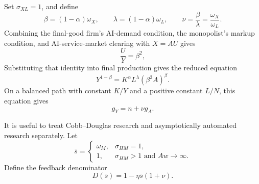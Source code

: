 Set \(\sigma_{XL}=1\), and define
\begin{equation}
 \beta=(1-\alpha)\omega_X,\qquad
 \lambda=(1-\alpha)\omega_L,\qquad
 \nu=\frac{\beta}{\lambda}=\frac{\omega_X}{\omega_L}.
 \label{eq:axm-cd-definitions}
\end{equation}
Combining the final-good firm's AI-demand condition, the monopolist's markup
condition, and AI-service-market clearing with \(X=AU\) gives
\begin{equation}
 \frac{U}{Y}=\beta^2,
 \label{eq:axm-inference-share-cd}
\end{equation}
Substituting that identity into final production gives the reduced equation
\begin{equation}
 Y^{1-\beta}
 =K^\alpha L^\lambda(\beta^2A)^\beta.
 \label{eq:axm-reduced-cd}
\end{equation}
On a balanced path with constant \(K/Y\) and a positive constant \(L/N\), this
equation gives
\begin{equation}
 g_Y=n+\nu g_A.
 \label{eq:axm-output-growth-cd}
\end{equation}

It is useful to treat Cobb--Douglas research and asymptotically automated research
separately. Let
\begin{equation}
 \bar s=
 \begin{cases}
  \omega_M,&\sigma_{HM}=1,\\
  1,&\sigma_{HM}>1\text{ and }Aw\to\infty.
 \end{cases}
 \label{eq:axm-sbar}
\end{equation}
Define the feedback denominator
\begin{equation}
 D(\bar s)=1-\eta\bar s(1+\nu).
 \label{eq:axm-feedback-denominator}
\end{equation}

